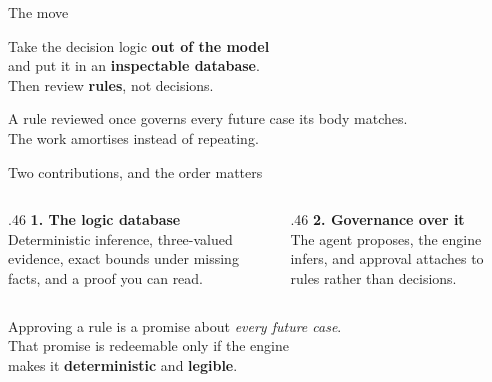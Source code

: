 \documentclass[aspectratio=169,11pt]{beamer}
\begin{document}
\begin{frame}{The move}
  \vspace{1.4em}
  \begin{center}\Large
    Take the decision logic \textbf{out of the model}\\[.4em]
    and put it in an \textbf{inspectable database}.\\[1.4em]
    \pause
    Then review \textbf{\color{pine}rules}, not decisions.
  \end{center}
  \vspace{1.6em}
  \pause
  \begin{center}\color{muted}
    A rule reviewed once governs every future case its body matches.\\
    The work amortises instead of repeating.
  \end{center}
\end{frame}

\begin{frame}{Two contributions, and the order matters}
  \vspace{1.2em}
  \begin{columns}[T]
    \begin{column}{.46\textwidth}
      {\color{pinedark}\textbf{1. The logic database}}\\[.5em]
      {\color{muted}Deterministic inference, three-valued evidence, exact bounds
      under missing facts, and a proof you can read.}
    \end{column}
    \begin{column}{.46\textwidth}
      {\color{pinedark}\textbf{2. Governance over it}}\\[.5em]
      {\color{muted}The agent proposes, the engine infers, and approval attaches
      to rules rather than decisions.}
    \end{column}
  \end{columns}
  \vspace{2em}
  \pause
  \begin{center}
    Approving a rule is a promise about \emph{every future case}.\\[.5em]
    {\large That promise is redeemable only if the engine\\
    makes it \textbf{\color{pine}deterministic} and \textbf{\color{pine}legible}.}
  \end{center}
\end{frame}
\end{document}
